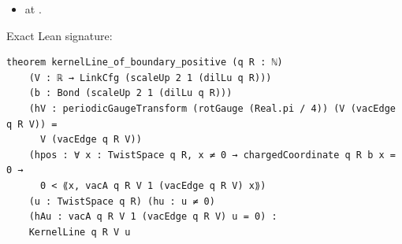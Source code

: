 \begin{theorem}[bp-222]
\begin{itemize}
\item \texttt{} at \texttt{}.
\end{itemize}
\par Exact Lean signature:
\begin{verbatim}
theorem kernelLine_of_boundary_positive (q R : ℕ)
    (V : ℝ → LinkCfg (scaleUp 2 1 (dilLu q R)))
    (b : Bond (scaleUp 2 1 (dilLu q R)))
    (hV : periodicGaugeTransform (rotGauge (Real.pi / 4)) (V (vacEdge q R V)) =
      V (vacEdge q R V))
    (hpos : ∀ x : TwistSpace q R, x ≠ 0 → chargedCoordinate q R b x = 0 →
      0 < ⟪x, vacA q R V 1 (vacEdge q R V) x⟫)
    (u : TwistSpace q R) (hu : u ≠ 0)
    (hAu : vacA q R V 1 (vacEdge q R V) u = 0) :
    KernelLine q R V u
\end{verbatim}
\end{theorem}


